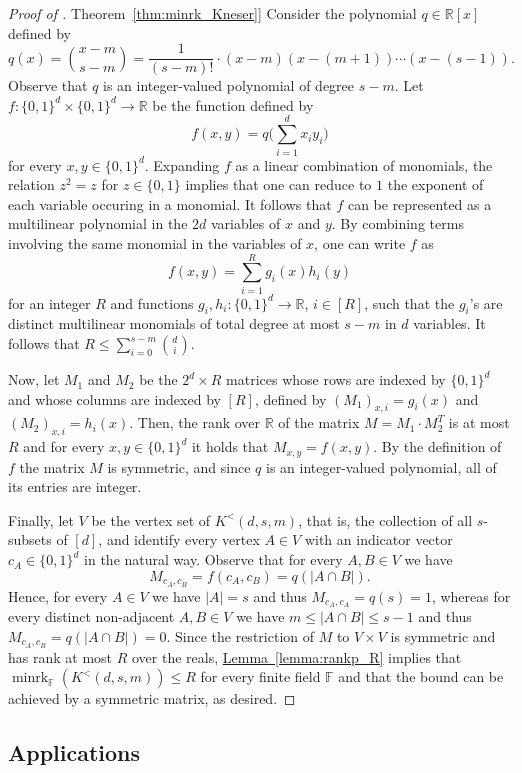 \documentclass[11pt]{article}
\numberwithin{equation}{section}
\theoremstyle{definition}
\theoremstyle{plain}
\newcommand{\R}{\mathbb R}
\newcommand{\expref}[2]{\hyperref[#2]{#1~\ref{#2}}}
\newcommand{\Fset}{\mathbb{F}}
\newcommand{\minrank}{\mathop{\mathrm{minrk}}}
\newcommand\Kneser[3]{K^<(#1,#2,#3)}
\begin{document}
\begin{proof}[Proof of \expref{Theorem}{thm:minrk_Kneser}]
Consider the polynomial $q \in \R[x]$ defined by
\[q(x) = {\binom {x-m} {s-m}} = \frac{1}{(s-m)!} \cdot (x-m)(x-(m+1)) \cdots (x-(s-1)).\]
Observe that $q$ is an integer-valued polynomial of degree $s-m$.
%
%
Let $f: \{0,1\}^d \times \{0,1\}^d \rightarrow \R$ be the function defined by
\[ f(x,y) = q  \Big ( \sum_{i=1}^{d}{x_i y_i}\Big )\]
for every $x,y \in \{0,1\}^d$.
Expanding $f$ as a linear combination of monomials, the relation $z^2 = z$ for $z \in \{0,1\}$ implies that one can reduce to $1$ the exponent of each variable occuring in a monomial. It follows that $f$ can be represented as a multilinear polynomial in the $2d$ variables of $x$ and $y$. By combining terms involving the same monomial in the variables of $x$, one can write $f$ as
\[ f(x,y) = \sum_{i=1}^{R}{g_i(x) h_i(y)} \]
for an integer $R$ and functions $g_i, h_i : \{0,1\}^d \rightarrow \R$, $i \in [R]$, such that the $g_i$'s are distinct multilinear monomials of total degree at most $s-m$ in $d$ variables. It follows that $R \leq \sum_{i=0}^{s-m}\binom{d}{i}$.

Now, let $M_1$ and $M_2$ be the $2^d \times R$ matrices whose rows are indexed by $\{0,1\}^d$ and whose columns are indexed by $[R]$, defined by $(M_1)_{x,i} = g_i(x)$ and $(M_2)_{x,i} = h_i(x)$. Then, the rank over $\R$ of the matrix $M = M_1 \cdot M_2^T$ is at most $R$ and for every $x,y \in\{0,1\}^d$ it holds that $M_{x,y} = f(x,y)$. By the definition of $f$ the matrix $M$ is symmetric, and since $q$ is an integer-valued polynomial, all of its entries are integer.

Finally, let $V$ be the vertex set of $\Kneser{d}{s}{m}$, that is, the collection of all $s$-subsets of $[d]$, and identify every vertex $A \in V$ with an indicator vector $c_A \in \{0,1\}^d$ in the natural way.
Observe that for every $A,B \in V$ we have
\[M_{c_A, c_B} = f(c_A,c_B) = q(|A \cap B|).\]
Hence, for every $A \in V$ we have $|A|=s$ and thus $M_{c_A,c_A} =q(s) = 1$, whereas for every distinct non-adjacent $A,B \in V$ we have $m \leq |A \cap B|\leq s-1$ and thus $M_{c_A,c_B} = q(|A \cap B|) =0$.
Since the restriction of $M$ to $V \times V$ is symmetric and has rank at most $R$ over the reals, \expref{Lemma}{lemma:rankp_R} implies that ${\minrank}_{\Fset}(\Kneser{d}{s}{m}) \leq R$ for every finite field $\Fset$ and that the bound can be achieved by a symmetric matrix, as desired.
\end{proof}

\subsection{Applications}
\end{document}
